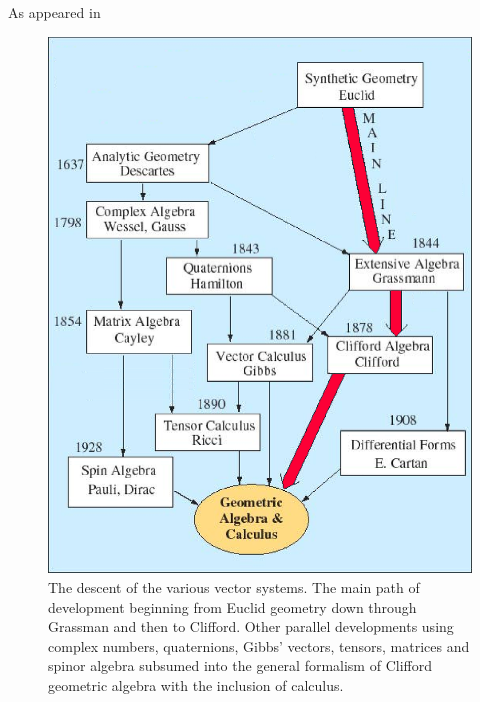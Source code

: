 \documentclass[handout,10pt]{beamer}
\begin{document}
\begin{frame}[shrink=20]{As appeared in \cite{abbott2}}

\begin{center}
\begin{figure}

\includegraphics[scale=0.47]{DescentVectors}

\caption{\label{DescentOfVectors} The descent of the various vector systems. The main path of development beginning from Euclid geometry down through Grassman and then to Clifford. Other parallel developments using complex numbers, quaternions, Gibbs' vectors, tensors, matrices and spinor algebra subsumed into the general formalism of Clifford geometric algebra with the inclusion of calculus.}
\end{figure}
\end{center}

\end{frame}
\end{document}
